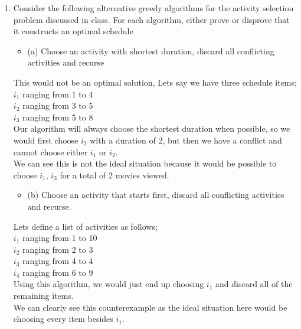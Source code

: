 \documentclass{article}
\begin{document}
\begin{enumerate}
\item Consider the following alternative greedy algorithms for the activity selection problem discussed in class. For each algorithm, either prove or disprove that it constructs an optimal schedule 
\begin{itemize}
    \item (a) Choose an activity with shortest duration, discard all conflicting activities and recurse
\end{itemize}
This would not be an optimal solution, Lets say we have three schedule items; \\
\newline
$i_1$ ranging from 1 to 4 \\
$i_2$ ranging from 3 to 5 \\
$i_3$ ranging from 5 to 8 \\
\newline 
Our algorithm will always choose the shortest duration when possible, so we would first choose $i_2$ with a duration of 2, but then we have a conflict and cannot choose either $i_1$ or $i_2$. \\
\newline
We can see this is not the ideal situation because it would be possible to choose $i_1$, $i_3$ for a total of 2 movies viewed. 







\newpage
\begin{itemize}
    \item (b) Choose an activity that starts first, discard all conflicting activities and recurse. 
\end{itemize}
Lets define a list of activities as follows; \\
\newline 
$i_1$ ranging from 1 to 10 \\
$i_2$ ranging from 2 to 3 \\
$i_3$ ranging from 4 to 4 \\
$i_4$ ranging from 6 to 9 \\
\newline 
Using this algorithm, we would just end up choosing $i_1$ and discard all of the remaining items. \\
\newline 
We can clearly see this counterexample as the ideal situation here would be choosing every item besides $i_1$. \\
\newline







\end{enumerate}
\end{document}
